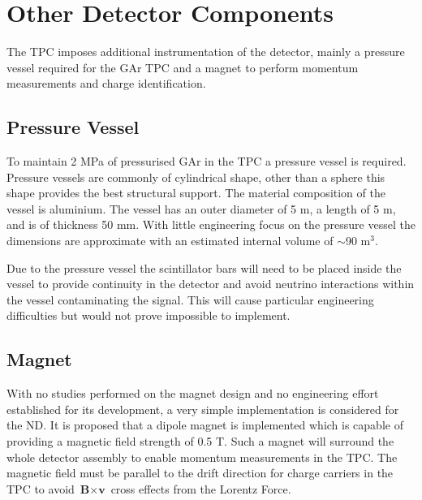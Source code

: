 \section{Other Detector Components}
The TPC imposes additional instrumentation of the detector, mainly a pressure vessel required for the GAr TPC and a magnet to perform momentum measurements and charge identification.
\subsection{Pressure Vessel}
To maintain 2 MPa of pressurised GAr in the TPC a pressure vessel is required. Pressure vessels are commonly of cylindrical shape, other than a sphere this shape provides the best structural support. The material composition of the vessel is aluminium. The vessel has an outer diameter of 5 m, a length of 5 m, and is of thickness 50 mm. With little engineering focus on the pressure vessel the dimensions are approximate with an estimated internal volume of $\sim$90 m$^{3}$. 

Due to the pressure vessel the scintillator bars will need to be placed inside the vessel to provide continuity in the detector and avoid neutrino interactions within the vessel contaminating the signal. This will cause particular engineering difficulties but would not prove impossible to implement.

\subsection{Magnet}
With no studies performed on the magnet design and no engineering effort established for its development, a very simple implementation is considered for the ND. It is proposed that a dipole magnet is implemented which is capable of providing a magnetic field strength of 0.5 T. Such a magnet will surround the whole detector assembly to enable momentum measurements in the TPC. The magnetic field must be parallel to the drift direction for charge carriers in the TPC to avoid $\textbf{B} \times \textbf{v}$ cross effects from the Lorentz Force. 

 
